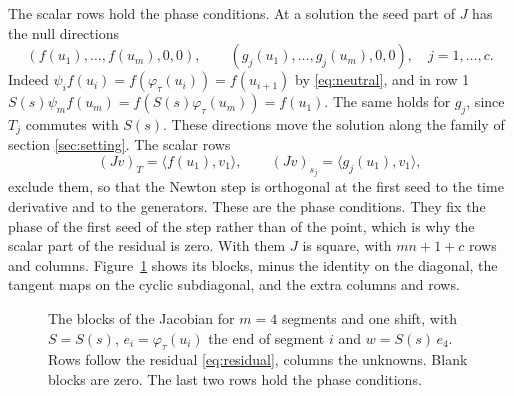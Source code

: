 \documentclass[11pt,a4paper]{article}
\newcommand{\ip}[2]{\langle #1, #2\rangle}
\begin{document}
The scalar rows hold the phase conditions. At a solution the seed part of $J$ has the null
directions
\begin{equation}
  (f(u_1), \dots, f(u_m), 0, 0), \qquad (g_j(u_1), \dots, g_j(u_m), 0, 0), \quad j = 1, \dots, c .
\end{equation}
Indeed $\psi_i f(u_i) = f(\varphi_\tau(u_i)) = f(u_{i+1})$ by \eqref{eq:neutral}, and in row 1
$S(s)\psi_m f(u_m) = f(S(s)\varphi_\tau(u_m)) = f(u_1)$. The same holds for $g_j$, since $T_j$
commutes with $S(s)$. These directions move the solution along the family of section
\ref{sec:setting}. The scalar rows
\begin{equation}
  (Jv)_{T} = \ip{f(u_1)}{v_1}, \qquad (Jv)_{s_j} = \ip{g_j(u_1)}{v_1},
\end{equation}
exclude them, so that the Newton step is orthogonal at the first seed to the time derivative and
to the generators. These are the phase conditions. They fix the phase of the first seed of the
step rather than of the point, which is why the scalar part of the residual is zero. With them $J$
is square, with $mn + 1 + c$ rows and columns. Figure~\ref{fig:jacobian} shows its blocks, minus
the identity on the diagonal, the tangent maps on the cyclic subdiagonal, and the extra columns
and rows.

\begin{figure}
  \centering
  \caption{The blocks of the Jacobian for $m = 4$ segments and one shift, with $S = S(s)$, $e_i =
  \varphi_\tau(u_i)$ the end of segment $i$ and $w = S(s)\,e_4$. Rows follow the residual \eqref{eq:residual}, columns the unknowns. Blank
  blocks are zero. The last two rows hold the phase conditions.}
  \label{fig:jacobian}
\end{figure}
\end{document}
